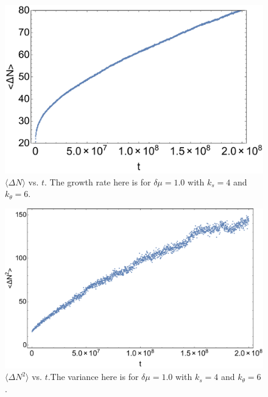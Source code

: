 \documentclass[amsmath,preprintnumbers,10pt,nofootinbib,prl,twocolumn]{revtex4-1}
\begin{document}
\begin{figure}[tbb]
\centering
\includegraphics[scale=0.37]{meanofmu3d3k4ktheta6.pdf}
\caption{$\langle\Delta N\rangle$ vs. $t$. The growth rate here is for $\delta \mu = 1.0$ with $k_s=4$ and $k_\theta = 6$.} \label{fig:GrowthRate}
\end{figure}
\begin{figure}[tbb]
\centering
\includegraphics[scale=0.25]{varianceofmu3d3k4ktheta6.pdf}
\caption{$\langle\Delta N^2\rangle$ vs. $t$.The variance here is for $\delta \mu = 1.0$ with $k_s=4$ and $k_\theta = 6$.} \label{fig:Variance}
\end{figure}
\end{document}

